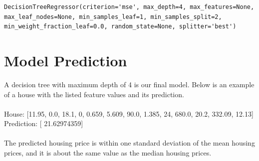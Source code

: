\documentclass[12pt, letterpaper]{article}
\begin{document}
\begin{lstlisting}
DecisionTreeRegressor(criterion='mse', max_depth=4, max_features=None,
max_leaf_nodes=None, min_samples_leaf=1, min_samples_split=2,
min_weight_fraction_leaf=0.0, random_state=None, splitter='best')
\end{lstlisting}

\section{Model Prediction}

A decision tree with maximum depth of 4 is our final model. Below is an example of a house with the listed feature values and its prediction.\\\\
House: [11.95, 0.0, 18.1, 0, 0.659, 5.609, 90.0, 1.385, 24, 680.0, 20.2, 332.09, 12.13]\\
Prediction: [ 21.62974359]\\\\
The predicted housing price is within one standard deviation of the mean housing prices, and it is about the same value as the median housing prices.
\end{document}
